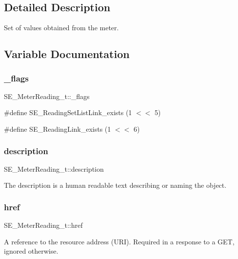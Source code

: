 \subsection{Detailed Description}
Set of values obtained from the meter. 

\subsection{Variable Documentation}
\mbox{\label{group__MeterReading_gad50fcf205c0820ea247fdbbb80b37059}} 
\subsubsection{\texorpdfstring{\+\_\+flags}{\_flags}}
{\footnotesize\ttfamily S\+E\+\_\+\+Meter\+Reading\+\_\+t\+::\+\_\+flags}

\#define S\+E\+\_\+\+Reading\+Set\+List\+Link\+\_\+exists (1 $<$$<$ 5)

\#define S\+E\+\_\+\+Reading\+Link\+\_\+exists (1 $<$$<$ 6) \mbox{\label{group__MeterReading_ga1d70f306503559815110dbf7512e1997}} 
\subsubsection{\texorpdfstring{description}{description}}
{\footnotesize\ttfamily S\+E\+\_\+\+Meter\+Reading\+\_\+t\+::description}

The description is a human readable text describing or naming the object. \mbox{\label{group__MeterReading_ga30eb76165fc6629c2c745e52f5fb3a43}} 
\subsubsection{\texorpdfstring{href}{href}}
{\footnotesize\ttfamily S\+E\+\_\+\+Meter\+Reading\+\_\+t\+::href}

A reference to the resource address (U\+RI). Required in a response to a G\+ET, ignored otherwise. \mbox{\label{group__MeterReading_ga53cdec433d7f97a25a229b7bd70be53e}} 
